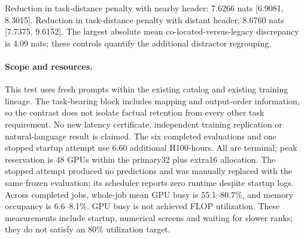 Reduction in task-distance penalty with nearby header: 7.6266 nats [6.9081, 8.3015].
Reduction in task-distance penalty with distant header: 8.6760 nats [7.7375, 9.6152].
The largest absolute mean co-located-versus-legacy discrepancy is 4.09 nats; these controls quantify the additional distractor regrouping.
\paragraph{Scope and resources.}
This test uses fresh prompts within the existing catalog and existing training lineage. The task-bearing block includes mapping and output-order information, so the contrast does not isolate factual retention from every other task requirement. No new latency certificate, independent training replication or natural-language result is claimed.
The six completed evaluations and one stopped startup attempt use 6.60 additional H100-hours. All are terminal; peak reservation is 48 GPUs within the primary32 plus extra16 allocation. The stopped attempt produced no predictions and was manually replaced with the same frozen evaluation; its scheduler reports zero runtime despite startup logs.
Across completed jobs, whole-job mean GPU busy is 55.1--80.7\%, and memory occupancy is 6.6--8.1\%. GPU busy is not achieved FLOP utilization. These measurements include startup, numerical screens and waiting for slower ranks; they do not satisfy an 80\% utilization target.

